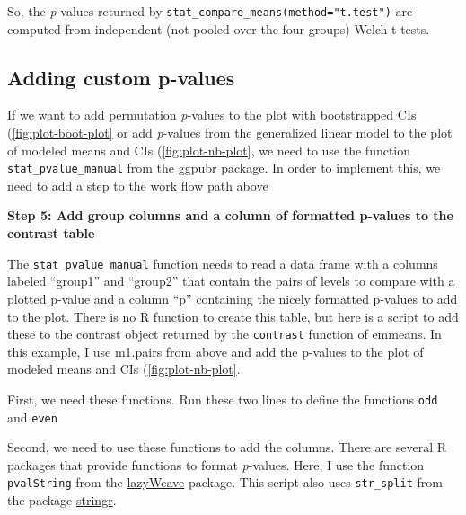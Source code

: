 \documentclass[]{book}
\newenvironment{Shaded}{\begin{snugshade}}{\end{snugshade}}
\newcommand{\ControlFlowTok}[1]{\textcolor[rgb]{0.13,0.29,0.53}{\textbf{#1}}}
\newcommand{\DecValTok}[1]{\textcolor[rgb]{0.00,0.00,0.81}{#1}}
\newcommand{\NormalTok}[1]{#1}
\newcommand{\OperatorTok}[1]{\textcolor[rgb]{0.81,0.36,0.00}{\textbf{#1}}}
\newcommand{\StringTok}[1]{\textcolor[rgb]{0.31,0.60,0.02}{#1}}
\begin{document}
So, the \emph{p}-values returned by \texttt{stat\_compare\_means(method="t.test")} are computed from independent (not pooled over the four groups) Welch t-tests.

\hypertarget{adding-custom-p-values}{%
\subsection{Adding custom p-values}\label{adding-custom-p-values}}

If we want to add permutation \emph{p}-values to the plot with bootstrapped CIs (\ref{fig:plot-boot-plot} or add \emph{p}-values from the generalized linear model to the plot of modeled means and CIs (\ref{fig:plot-nb-plot}, we need to use the function \texttt{stat\_pvalue\_manual} from the ggpubr package. In order to implement this, we need to add a step to the work flow path above

\textbf{Step 5: Add group columns and a column of formatted p-values to the contrast table}

The \texttt{stat\_pvalue\_manual} function needs to read a data frame with a columns labeled ``group1'' and ``group2'' that contain the pairs of levels to compare with a plotted p-value and a column ``p'' containing the nicely formatted p-values to add to the plot. There is no R function to create this table, but here is a script to add these to the contrast object returned by the \texttt{contrast} function of emmeans. In this example, I use m1.pairs from above and add the p-values to the plot of modeled means and CIs (\ref{fig:plot-nb-plot}.

First, we need these functions. Run these two lines to define the functions \texttt{odd} and \texttt{even}

\begin{Shaded}
\end{Shaded}

Second, we need to use these functions to add the columns. There are several R packages that provide functions to format \emph{p}-values. Here, I use the function \texttt{pvalString} from the \href{https://www.rdocumentation.org/packages/lazyWeave/versions/3.0.2/topics/pvalString}{lazyWeave} package. This script also uses \texttt{str\_split} from the package \href{https://cran.r-project.org/web/packages/stringr/index.html}{stringr}.
\end{document}
